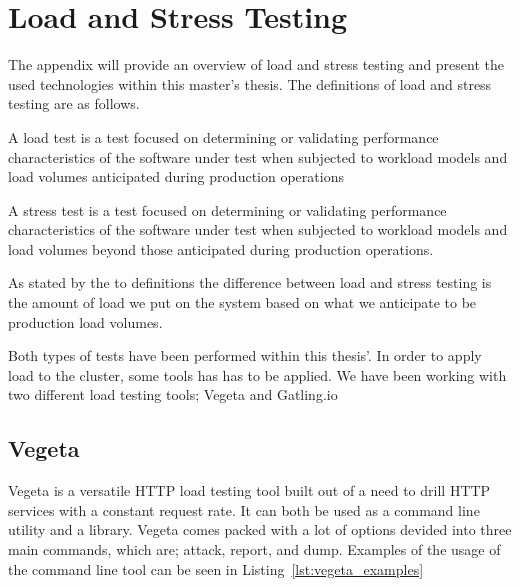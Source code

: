 \chapter{Load and Stress Testing}
\label{appendix:d_resilience}

The appendix will provide an overview of load and stress testing and present the used technologies within this master's thesis. The definitions of load and stress testing are as follows.

\begin{definition} 
 A load test is a test focused on determining or validating performance characteristics of the software under test when subjected to workload models and load volumes anticipated during production operations
\end{definition}

\begin{definition} 
 A stress test is a test focused on determining or validating performance characteristics of the software under test when subjected to workload models and load volumes beyond those anticipated during production operations.
\end{definition}

\noindent As stated by the to definitions the difference between load and stress testing is the amount of load we put on the system based on what we anticipate to be production load volumes. 

\noindent Both types of tests have been performed within this thesis'. In order to apply load to the cluster, some tools has has to be applied. We have been working with two different load testing tools; Vegeta and Gatling.io


\section*{Vegeta}
Vegeta is a versatile HTTP load testing tool built out of a need to drill HTTP services with a constant request rate. It can both be used as a command line utility and a library. Vegeta comes packed with a lot of options devided into three main commands, which are; attack, report, and dump. Examples of the usage of the command line tool can be seen in Listing~\ref{lst:vegeta_examples}


